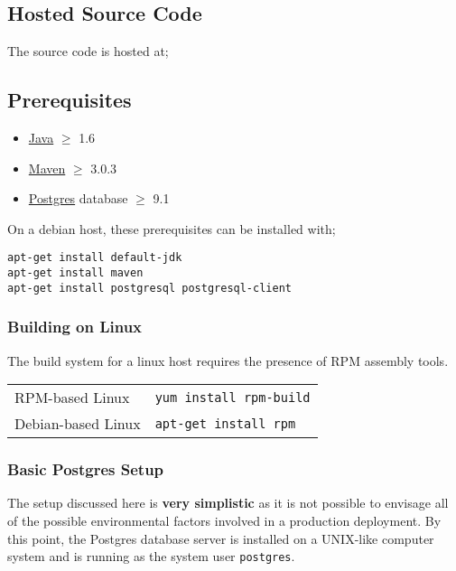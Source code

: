 \subsection{Hosted Source Code}

The source code is hosted at;


\subsection{Prerequisites}
\label{prerequisites}

\begin{itemize}
\item \href{https://community.java.net/open-jdk}{Java} $\geqslant$ 1.6
\item \href{http://maven.apache.org}{Maven} $\geqslant$ 3.0.3
\item \href{http://www.postgres.org}{Postgres} database $\geqslant$ 9.1
\end{itemize}

On a debian host, these prerequisites can be installed with;

\begin{verbatim}
apt-get install default-jdk
apt-get install maven
apt-get install postgresql postgresql-client
\end{verbatim}

\subsubsection{Building on Linux}
\label{prerequisites-buildingonlinux}

The build system for a linux host requires the presence of RPM assembly tools.

\begin{tabular}{|l|l|}
\hline
RPM-based Linux & {\tt yum install rpm-build} \\
Debian-based Linux & {\tt apt-get install rpm} \\
\hline
\end{tabular}

\subsubsection{Basic Postgres Setup}

The setup discussed here is {\bf very simplistic} as it is not possible to envisage all of the possible environmental factors involved in a production deployment.  By this point, the Postgres database server is  installed on a UNIX-like computer system and is running as the system user {\tt postgres}.

